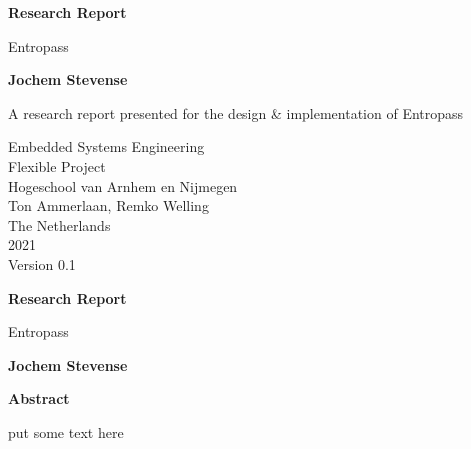 \documentclass[a4paper,12pt]{article}
\begin{document}
\begin{titlepage}
  \begin{center}
    \vspace*{1cm}

    \Huge
    \textbf{Research Report}

    \vspace{0.5cm}
    \LARGE
    Entropass

    \vspace{1.5cm}

    \textbf{Jochem Stevense}

    \vfill

    A research report presented for the design \& implementation of Entropass

    \vspace{0.8cm}


    \Large
    Embedded Systems Engineering\\
    Flexible Project\\
    Hogeschool van Arnhem en Nijmegen\\
    Ton Ammerlaan, Remko Welling\\
    The Netherlands\\
    2021\\
    Version 0.1
  \end{center}
\end{titlepage}

\thispagestyle{plain}
\begin{center}
    \Large
    \textbf{Research Report}
        
    \vspace{0.4cm}
    \large
    Entropass
        
    \vspace{0.4cm}
    \textbf{Jochem Stevense}
       
    \vspace{0.9cm}
    \textbf{Abstract}
  \end{center}
  put some text here
  \newpage
\end{document}
